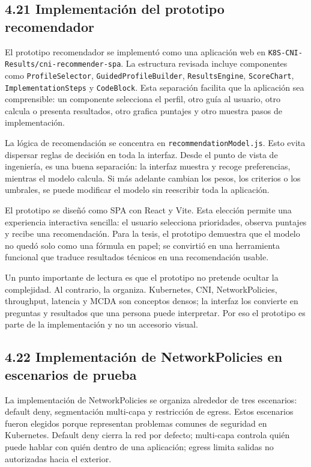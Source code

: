 \subsection{4.21 Implementación del prototipo recomendador}

El prototipo recomendador se implementó como una aplicación web en \texttt{K8S-CNI-Results/cni-recommender-spa}. La estructura revisada incluye componentes como \texttt{ProfileSelector}, \texttt{GuidedProfileBuilder}, \texttt{ResultsEngine}, \texttt{ScoreChart}, \texttt{ImplementationSteps} y \texttt{CodeBlock}. Esta separación facilita que la aplicación sea comprensible: un componente selecciona el perfil, otro guía al usuario, otro calcula o presenta resultados, otro grafica puntajes y otro muestra pasos de implementación.

La lógica de recomendación se concentra en \texttt{recommendationModel.js}. Esto evita dispersar reglas de decisión en toda la interfaz. Desde el punto de vista de ingeniería, es una buena separación: la interfaz muestra y recoge preferencias, mientras el modelo calcula. Si más adelante cambian los pesos, los criterios o los umbrales, se puede modificar el modelo sin reescribir toda la aplicación.

El prototipo se diseñó como SPA con React y Vite. Esta elección permite una experiencia interactiva sencilla: el usuario selecciona prioridades, observa puntajes y recibe una recomendación. Para la tesis, el prototipo demuestra que el modelo no quedó solo como una fórmula en papel; se convirtió en una herramienta funcional que traduce resultados técnicos en una recomendación usable.

Un punto importante de lectura es que el prototipo no pretende ocultar la complejidad. Al contrario, la organiza. Kubernetes, CNI, NetworkPolicies, throughput, latencia y MCDA son conceptos densos; la interfaz los convierte en preguntas y resultados que una persona puede interpretar. Por eso el prototipo es parte de la implementación y no un accesorio visual.

\subsection{4.22 Implementación de NetworkPolicies en escenarios de prueba}

La implementación de NetworkPolicies se organiza alrededor de tres escenarios: default deny, segmentación multi-capa y restricción de egress. Estos escenarios fueron elegidos porque representan problemas comunes de seguridad en Kubernetes. Default deny cierra la red por defecto; multi-capa controla quién puede hablar con quién dentro de una aplicación; egress limita salidas no autorizadas hacia el exterior.

